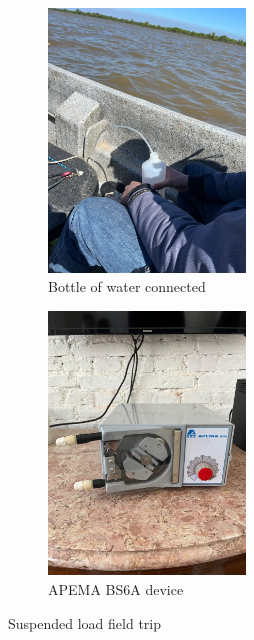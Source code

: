 \begin{figure}[H]
    \begin{subfigure}[b]{0.48\textwidth}
        \includegraphics[width=\linewidth, height=7cm]{figures/ch4/fles.jpg}
        \caption{Bottle of water connected}
        \label{fig:third}
    \end{subfigure}
    \hfill
    \begin{subfigure}[b]{0.48\textwidth}
        \includegraphics[width=\linewidth, height=7cm]{figures/ch4/APEMA BS6A.jpg}
        \caption{APEMA BS6A device}
        \label{fig:fourth}
    \end{subfigure}

    \caption{Suspended load field trip}
    \label{fig:suspended sediment}
\end{figure}




